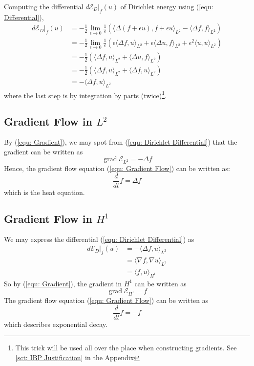 \documentclass[a4paper]{article}
\theoremstyle{definition}
\DeclareMathOperator{\grad}{grad}
\begin{document}
Computing the differential $d \mathcal{E}_D|_f (u)$ of Dirichlet energy using (\ref{equ: Differential}),
\begin{align}
    d \mathcal{E}_D|_f(u) &= -\frac{1}{2} \lim_{\epsilon \rightarrow 0} \frac{1}{\epsilon} \left( \langle \Delta (f+\epsilon u), f + \epsilon u \rangle_{L^2} - \langle \Delta f, f \rangle_{L^2} \right) \\
    &= -\frac{1}{2} \lim_{\epsilon \rightarrow 0} \frac{1}{\epsilon} \left( \epsilon \langle \Delta f, u \rangle_{L^2} + \epsilon \langle \Delta u, f \rangle_{L^2} + \epsilon^2 \langle u, u \rangle_{L^2} \right) \\
    &= -\frac{1}{2} (\langle \Delta f,u \rangle_{L^2} + \langle \Delta u, f \rangle_{L^2}) \\
    &= -\frac{1}{2} (\langle \Delta f,u \rangle_{L^2} + \langle \Delta f, u \rangle_{L^2}) \\
    &= -\langle \Delta f, u \rangle_{L^2}
    \label{equ: Dirichlet Differential}
\end{align}
where the last step is by integration by parts (twice)\footnote{This trick will be used all over the place when constructing gradients. See \ref{sct: IBP Justification} in the Appendix}.

\subsection{Gradient Flow in $L^2$}
By (\ref{equ: Gradient}), we may spot from (\ref{equ: Dirichlet Differential}) that the gradient can be written as
\begin{equation}
    \grad \mathcal{E}_{L^2} = - \Delta f
    \label{equ: L2 Gradient}
\end{equation}
Hence, the gradient flow equation (\ref{equ: Gradient Flow}) can be written as:
\begin{equation}
    \frac{d}{dt} f = \Delta f
    \label{equ: L2 Gradient Flow}
\end{equation}
which is the heat equation.


\subsection{Gradient Flow in $H^1$}
We may express the differential (\ref{equ: Dirichlet Differential}) as
\begin{align}
    d \mathcal{E}_D|_f (u) &= - \langle \Delta f, u \rangle_{L^2} \\
    &= \langle \nabla f, \nabla u \rangle_{L^2} \\
    &= \langle f, u \rangle_{H^1}
    \label{equ: Gradient H1 Derivation}
\end{align}
So by (\ref{equ: Gradient}), the gradient in $H^1$ can be written as
\begin{equation}
    \grad \mathcal{E}_{H^1} = f
    \label{equ: H1 Gradient}
\end{equation}
The gradient flow equation (\ref{equ: Gradient Flow}) can be written as
\begin{equation}
    \frac{d}{dt}f = -f
    \label{equ: H1 Gradient Flow}
\end{equation}
which describes exponential decay.
\end{document}
